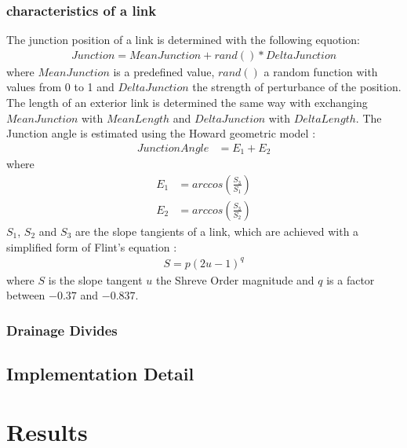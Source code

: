 \documentclass[11pt,a4paper]{article}
\begin{document}
\subsubsection{characteristics of a link}
The junction position of a link is determined with the following equotion:
\begin{align}
Junction = MeanJunction + rand() * DeltaJunction
\end{align} 
where $MeanJunction$ is a predefined value, $rand()$ a random function with
values from 0 to 1 and $DeltaJunction$ the strength of perturbance of the position.
The length of an exterior link is determined the same way with exchanging
$MeanJunction$ with $MeanLength$ and $DeltaJunction$ with $DeltaLength$.
The Junction angle is estimated using the Howard geometric model
\cite{howard1971optimal}:
\begin{align}
JunctionAngle &= E_1 + E_2
\end{align}
where
\begin{align}
E_1 &= arccos(\frac{S_3}{S_1}) \\
E_2 &= arccos(\frac{S_3}{S_2})
\end{align} 
$S_1$, $S_2$ and $S_3$ are the slope tangients of a link, which are achieved
with a simplified form of Flint's equation \cite{flint1974stream}:
\begin{align}
S = p(2u - 1)^q
\end{align}
where $S$ is the slope tangent $u$ the Shreve Order magnitude and $q$ is a
factor between $-0.37$ and $-0.837$.
\subsubsection{Drainage Divides}

\subsection{Implementation Detail}

\section{Results}


\newpage


\end{document}

